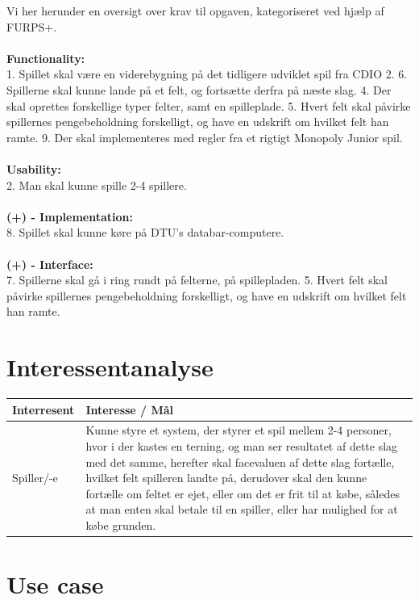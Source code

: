\noindent Vi her herunder en oversigt over krav til opgaven, kategoriseret ved hjælp af FURPS+.
\\\\\textbf{Functionality:}\\
1. Spillet skal være en viderebygning på det tidligere udviklet spil fra CDIO 2.
6. Spillerne skal kunne lande på et felt, og fortsætte derfra på næste slag.
4. Der skal oprettes forskellige typer felter, samt en spilleplade.
5. Hvert felt skal påvirke spillernes pengebeholdning forskelligt, og have en udskrift om hvilket felt han ramte.
9. Der skal implementeres med regler fra et rigtigt Monopoly Junior spil.
\\\\\textbf{Usability:}\\
2. Man skal kunne spille 2-4 spillere.
\\\\\textbf{(+) - Implementation:}\\
8. Spillet skal kunne køre på DTU's databar-computere.
\\\\\textbf{(+) - Interface:}\\
7. Spillerne skal gå i ring rundt på felterne, på spillepladen.
5. Hvert felt skal påvirke spillernes pengebeholdning forskelligt, og have en udskrift om hvilket felt han ramte.

\pagebreak

\section{Interessentanalyse}

    \begin{tabular}{ | l | p{13cm} |}
    \hline
    \textbf{Interresent} & \textbf{Interesse / Mål} \\ \hline
    Spiller/-e & Kunne styre et system, der styrer et spil mellem 2-4 personer, 
    hvor i der kastes en terning, og man ser resultatet af dette slag med det samme, herefter skal facevaluen af dette slag fortælle, hvilket felt spilleren landte på, derudover skal den kunne fortælle om feltet er ejet, eller om det er frit til at købe, således at man enten skal betale til en spiller, eller har mulighed for at købe grunden.\\ \hline
    \hline
    \end{tabular}


\newpage

\section{Use case}

